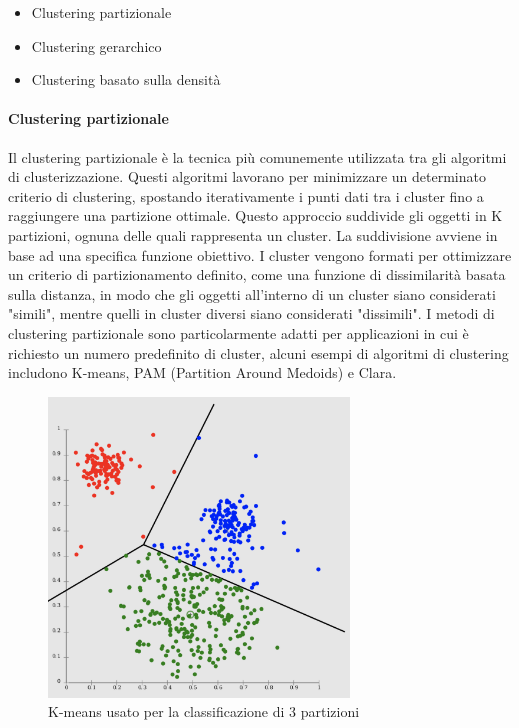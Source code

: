 \documentclass[12pt, a4paper, italian]{report}
\numberwithin{figure}{chapter}
\numberwithin{table}{chapter}
\begin{document}
\begin{itemize}
    \item Clustering partizionale
    \item Clustering gerarchico
    \item Clustering basato sulla densità
\end{itemize}

\paragraph{Clustering partizionale} 
Il clustering partizionale è la tecnica più comunemente utilizzata tra gli algoritmi di clusterizzazione. Questi algoritmi lavorano per minimizzare un determinato criterio di clustering, spostando iterativamente i punti dati tra i cluster fino a raggiungere una partizione ottimale. Questo approccio suddivide gli oggetti in K partizioni, ognuna delle quali rappresenta un cluster. La suddivisione avviene in base ad una specifica funzione obiettivo. I cluster vengono formati per ottimizzare un criterio di partizionamento definito, come una funzione di dissimilarità basata sulla distanza, in modo che gli oggetti all'interno di un cluster siano considerati "simili", mentre quelli in cluster diversi siano considerati "dissimili". I metodi di clustering partizionale sono particolarmente adatti per applicazioni in cui è richiesto un numero predefinito di cluster, alcuni esempi di algoritmi di clustering includono K-means, PAM (Partition Around Medoids) e Clara.

\begin{figure}[h] \centering
\includegraphics[width=8cm]{C_Partizionale.png}
\caption{K-means usato per la classificazione di 3 partizioni\protect\footnotemark}
\label{fig:esempio k-means}
\end{figure}
\end{document}
